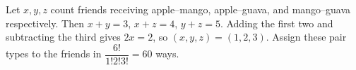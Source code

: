 Let $x,y,z$ count friends receiving apple--mango, apple--guava, and mango--guava respectively. Then $x+y=3$, $x+z=4$, $y+z=5$. Adding the first two and subtracting the third gives $2x=2$, so $(x,y,z)=(1,2,3)$. Assign these pair types to the friends in $\dfrac{6!}{1!2!3!}=\boxed{60}$ ways.
